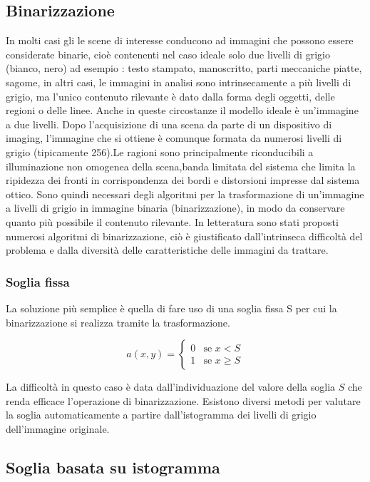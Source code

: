 \subsection{Binarizzazione} In molti casi gli le scene di interesse conducono
ad immagini che possono essere  considerate binarie, cioè contenenti nel caso
ideale solo due livelli di grigio (bianco, nero) ad esempio : testo stampato,
manoscritto, parti meccaniche piatte, sagome, in altri casi, le immagini in
analisi sono  intrinsecamente a più livelli di grigio, ma  l’unico contenuto
rilevante è dato dalla forma  degli oggetti, delle regioni o delle linee.
Anche in queste circostanze il modello ideale  è un’immagine a due livelli.
Dopo l’acquisizione di una scena da parte di un dispositivo di imaging,
l’immagine che si ottiene è comunque  formata da numerosi livelli di grigio
(tipicamente 256).Le ragioni sono principalmente riconducibili  a
illuminazione non omogenea della scena,banda limitata del sistema che limita
la ripidezza  dei fronti in corrispondenza dei bordi e distorsioni impresse
dal sistema ottico. Sono quindi necessari degli algoritmi per la
trasformazione di un’immagine a livelli di  grigio in immagine binaria
(binarizzazione), in  modo da conservare quanto più possibile il  contenuto
rilevante. In letteratura sono stati proposti numerosi  algoritmi di
binarizzazione, ciò è giustificato  dall’intrinseca difficoltà del problema e
dalla  diversità delle caratteristiche delle immagini  da trattare.


\subsubsection{Soglia fissa}

La soluzione più semplice è quella di fare uso 
di una soglia fissa S per cui la binarizzazione 
si realizza tramite la trasformazione.

\[
a(x,y) =
  \begin{cases}
   0       & \text{se } x < S \\
   1       & \text{se } x \geq S
  \end{cases}
\]

La difficoltà in questo caso è data  dall’individuazione del valore della
soglia $S$  che renda efficace l’operazione di  binarizzazione. Esistono
diversi metodi per valutare la soglia  automaticamente a partire
dall’istogramma  dei livelli di grigio dell’immagine originale.

\subsection{Soglia basata su istogramma}

